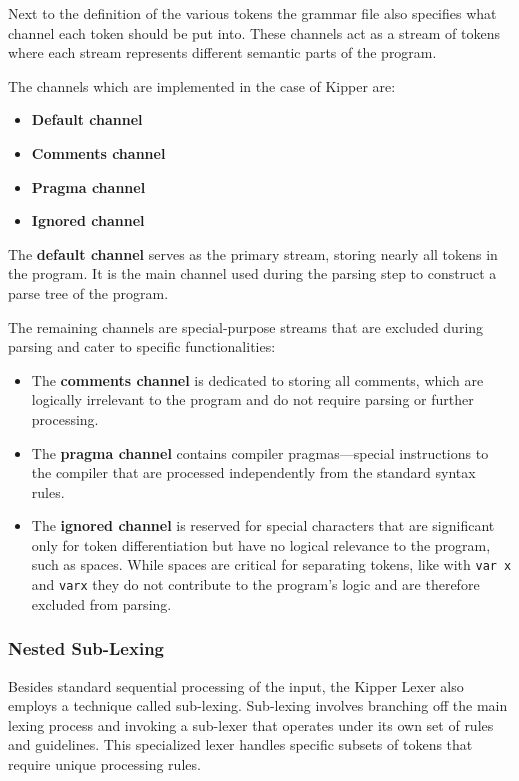 Next to the definition of the various tokens the grammar file also specifies what channel each token should be put into. These channels act as a stream of tokens where each stream represents different semantic parts of the program.

The channels which are implemented in the case of Kipper are:

\begin{itemize}
	\item \textbf{Default channel}
	\item \textbf{Comments channel}
	\item \textbf{Pragma channel}
	\item \textbf{Ignored channel}
\end{itemize}

The \textbf{default channel} serves as the primary stream, storing nearly all tokens in the program. It is the main channel used during the parsing step to construct a parse tree of the program.

The remaining channels are special-purpose streams that are excluded during parsing and cater to specific functionalities:

\begin{itemize}
	\item The \textbf{comments channel} is dedicated to storing all comments, which are logically irrelevant to the program and do not require parsing or further processing.
	\item The \textbf{pragma channel} contains compiler pragmas—special instructions to the compiler that are processed independently from the standard syntax rules.
	\item The \textbf{ignored channel} is reserved for special characters that are significant only for token differentiation but have no logical relevance to the program, such as spaces. While spaces are critical for separating tokens, like with \lstinline|var x| and \lstinline|varx| they do not contribute to the program's logic and are therefore excluded from parsing.
\end{itemize}
	
\subsubsection{Nested Sub-Lexing}
\label{sec:nested-sub-lexing}

Besides standard sequential processing of the input, the Kipper Lexer also employs a technique called sub-lexing. Sub-lexing involves branching off the main lexing process and invoking a sub-lexer that operates under its own set of rules and guidelines. This specialized lexer handles specific subsets of tokens that require unique processing rules.

